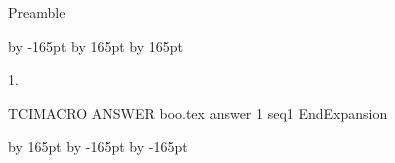 Preamble


\renewcommand{\RM}{1}%
\setcounter{page}{2}%
\setlength{\columnsep}{24pt}
\advance \leftskip by -165pt
\advance\hsize by 165pt
\advance\linewidth by 165pt
\begin{multicols}{2}%


\begin{ExerciseList}

\item[\hfill 1.]

TCIMACRO
ANSWER
boo.tex answer 1 seq1
EndExpansion

\end{ExerciseList}


\end{multicols}
\advance \leftskip by 165pt
\advance\hsize by -165pt
\advance\linewidth by -165pt%




